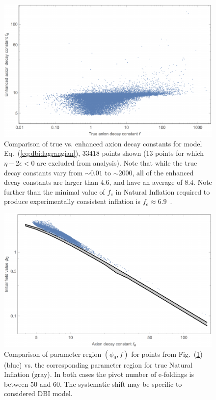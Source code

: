 \documentclass[12pt]{article}
\begin{document}
\begin{figure} \label{fig:DBI:parameters} %
  \centering
  \includegraphics[width = 0.5 \textwidth]{figs/fige.pdf}
  \caption{Comparison of true vs. enhanced axion decay constants for model Eq.~(\ref{eq:dbi:lagrangian}), $33418$ points shown ($13$ points for which $\eta - 2\epsilon < 0$ are excluded from analysis).
    Note that while the true decay constants vary from $\sim 0.01$ to $\sim 2000$, all of the enhanced decay constants are larger than $4.6$, and have an average of $8.4$.
    Note further than the minimal value of $f_e$ in Natural Inflation required to produce experimentally consistent inflation is $f_e \approx 6.9$~\cite{Ade:2015lrj}.}
\end{figure}

\begin{figure} \label{fig:DBI:observables} %
  \centering
  \includegraphics[width = 0.5 \textwidth]{figs/figc.pdf}
  \caption{Comparison of parameter region $\left(\phi_0, f\right)$ for points from Fig.~(\ref{fig:DBI:parameters}) (blue) vs. the corresponding parameter region for true Natural Inflation (gray).
    In both cases the pivot number of e-foldings is between $50$ and $60$.
    The systematic shift may be specific to considered DBI model.}
\end{figure}

\end{document}
